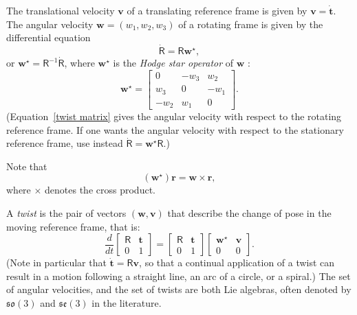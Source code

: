 \documentclass[reqno,12pt]{amsart}
\newcommand\starop[1]{#1^\star}
\begin{document}
The translational velocity $\bm v$ of a translating reference frame is given by $\bm v = \dot{\bm t}$.  The angular velocity $\bm w = (w_1, w_2, w_3)$ of a rotating frame is given by the differential equation
\begin{equation}
\label{twist matrix}
\dot{\mathsf R} = \mathsf R \starop{\bm w},
\end{equation}
or $\starop{\bm w} = \mathsf R^{-1} \dot{\mathsf R}$,
where $\starop{\bm w}$ is the \emph{Hodge star operator} of $\bm w$ \cite{wiki0}:
\begin{equation}
\starop{\bm w} = \begin{bmatrix}  0   & -w_3 &  w_2 \\
                               w_3 &  0   & -w_1 \\
                              -w_2 &  w_1 &  0 \end{bmatrix} .
\end{equation}
(Equation~\eqref{twist matrix} gives the angular velocity with respect to the rotating reference frame.  If one wants the angular velocity with respect to the stationary reference frame, use instead $\dot{\mathsf R} = \starop{\bm w} \mathsf R$.)

Note that
\begin{equation}
\label{w star to w cross}
(\starop{\bm w}) \bm r = \bm w \times \bm r ,
\end{equation}
where $\times$ denotes the cross product.

A \emph{twist} is the pair of vectors $(\bm w, \bm v)$ that describe the change of pose in the moving reference frame, that is:
\begin{equation}
\label{ode twist}
\frac d{dt} \begin{bmatrix} \mathsf R & \bm t \\ 0 & 1 \end{bmatrix}
= \begin{bmatrix} \mathsf R & \bm t \\ 0 & 1 \end{bmatrix}
\begin{bmatrix} \starop{\bm w} & \bm v \\ 0 & 0 \end{bmatrix}.
\end{equation}
(Note in particular that $\dot{\bm t} = \mathsf R \bm v$, so that a continual application of a twist can result in a motion following a straight line, an arc of a circle, or a spiral.)  The set of angular velocities, and the set of twists are both Lie algebras, often denoted by $\mathfrak{so}(3)$ and $\mathfrak{se}(3)$ in the literature.
\end{document}
